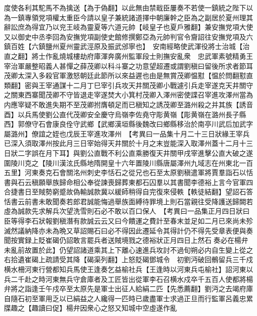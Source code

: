 度使各利其駝馬不為擒送【為于偽翻】以此無由禁戢臣屢奏不若使一鎮統之陛下以為一鎮專領党項權太重臣今請以皇子兼統諸道擇中朝廉幹之臣為之副居於夏州理其辭訟庶為得宜乃以兖王岐為靈夏等六道元帥【岐皇子也夏戶雅翻】兼安撫党項大使又以御史中丞李回為安撫党項副使史館修撰鄭亞為元帥判官令齎詔往安撫党項及六鎮百姓【六鎮鹽州夏州靈武涇原及振武邠寧也】　安南經略使武渾役將士治城【治直之翻】將士作亂燒城樓劫府庫渾奔廣州監軍段士則撫安亂衆　忠武軍素號精勇王宰治軍嚴整昭義人甚憚之薛茂卿以科斗寨之功意望超遷或謂劉稹曰留後所求者節耳茂卿太深入多殺官軍激怒朝廷此節所以來益遲也由是無賞茂卿愠懟【愠於問翻懟直類翻】密與王宰通謀十二月丁巳宰引兵攻天井關茂卿小戰遽引兵走宰遂克天井關守之關東西寨聞茂卿不守皆退走宰遂焚大小箕村茂卿入澤州密使諜召宰進攻澤州當為内應宰疑不敢進失期不至茂卿拊膺頓足而已稹知之誘茂卿至潞州殺之并其族【誘音酉】以兵馬使劉公直代茂卿安全慶守烏嶺李佐堯守彫黄嶺【彫黄嶺在潞州長子縣西】郭僚守石會康良佺守武鄉【武鄉漢垣縣後魏改曰鄉縣移治於南亭川武后加武字屬潞州】僚誼之姪也戊辰王宰進攻澤州　【考異曰一品集十月二十三日狀緣王宰兵已深入須取澤州按此月三日宰始得天井關於十月之末豈能深入取澤州蓋十二月十三日狀二字誤在月下耳】與劉公直戰不利公直乘勝復天井關甲戌宰進擊公直大破之遂圍陵川克之【陵川漢泫氏縣地隋開皇十六年置陵川縣唐屬澤州九域志在州東北一百五里】河東奏克石會關洺州刺史李恬石之從兄也石至太原劉稹遣軍將賈羣詣石以恬書與石云稹願舉族歸命相公奉從諫喪歸葬東都石囚羣以其書聞李德裕上言今官軍四合捷書日至賊勢窮蹙故偽輸誠款冀以緩師稍得自完復來侵軼【軼徒結翻】望詔石答恬書云前書未敢聞奏若郎君誠能悔過舉族面縛待罪境上則石當親往受降護送歸闕若虛為誠款先求解兵次望洗雪則石必不敢以百口保人　【考異曰一品集正月四日狀曰臣等得李石狀報劉稹潛有款誠云云又曰今饋運之費計至春末並足如二月已來尚未殄滅然議納降亦未為晩又草詔賜石曰必不得因此遷延令其得計仍不得先受章表便與奏聞按實録上貶崔碣仍詔敢言罷兵者送賊境戮之德裕狀正月四日上然石奏必在楊弁未亂前故置於此】仍望詔諸道乘其上下離心速進兵攻討不過旬朔必内自生變上從之右拾遺崔碣上疏請受其降【碣渠列翻】上怒貶碣鄧城令　初劉沔破回鶻留兵三千戍横水柵河東行營都知兵馬使王逢奏乞益榆社兵【王逢時以河東兵屯榆社】詔河東以兵二千赴之時河東無兵守倉庫者及工匠皆出從軍李石召横水戍卒千五百人使都將楊弁將之詣逢壬午戍卒至太原先是軍士出征人給絹二匹【先悉薦翻】劉沔之去竭府庫自隨石初至軍用乏以已絹益之人纔得一匹時已歲盡軍士求過正旦而行監軍呂義忠累牒趣之【趣讀曰促】楊弁因衆心之怒又知城中空虛遂作亂

